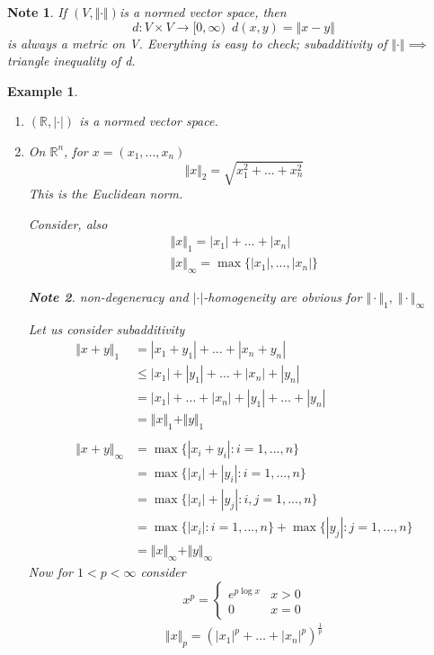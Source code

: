 \documentclass[11pt, oneside]{book}
\theoremstyle{break}
\newtheorem*{note}{Note}
\newtheorem{eg}{Example}[section]
\newcommand{\bb}[1]{\mathbb{#1}}			%
\begin{document}
\begin{note}
	If $(V, \Vert \cdot\Vert )$is a normed vector space, then
	\begin{equation}
		d: V \times V \to [0, \infty) \enspace d(x,y) = \Vert x - y \Vert
	\end{equation}
	is always a metric on V. Everything is easy to check; subadditivity of $\Vert \cdot\Vert  \implies$ triangle inequality of d.
\end{note}

\begin{eg}
	\begin{enumerate}
		\item $(\bb{R}, |\cdot|)$ is a normed vector space.
		\item On $\bb{R}^n$, for $x = (x_1, ..., x_n)$
			\begin{equation}
				\Vert x\Vert _2 = \sqrt{x_1^2 + \hdots + x_n^2}
			\end{equation}
			This is the Euclidean norm.

			Consider, also
			\begin{gather*}
				\Vert x\Vert _1 = |x_1| + \hdots + |x_n| \\
				\Vert x\Vert _\infty = \max\{|x_1|, ..., |x_n|\}
			\end{gather*}

			\begin{note}
				non-degeneracy and $|\cdot|$-homogeneity are obvious for $\Vert \cdot\Vert _1, \; \Vert \cdot\Vert _\infty$
			\end{note}

			Let us consider subadditivity
			\begin{align*}
				\Vert x + y\Vert _1 &= |x_1 + y_1| + \hdots + |x_n + y_n| \\
										&\leq |x_1| + |y_1| + \hdots + |x_n| + |y_n| \\
										&= |x_1| + \hdots + |x_n| + |y_1| + \hdots + |y_n| \\
										&= \Vert x\Vert _1 + \Vert y\Vert _1 \\
										\\
				\Vert x + y\Vert _\infty &= \max\{|x_i + y_i| : i = 1, ..., n\} \\
												&= \max\{|x_i| + |y_i| : i = 1, ..., n\} \\
												&= \max\{|x_i| + |y_j| : i, j = 1, ..., n\} \\
												&= \max\{|x_i| : i = 1, ..., n\} + \max\{|y_j| : j = 1, ..., n\}\\
												&= \Vert x\Vert _\infty + \Vert y\Vert _\infty
			\end{align*}
			Now for $1 < p < \infty$ consider
			\begin{equation}
				x^p =
					\begin{cases}
						e^{p \log x} & x > 0 \\
						0	& x = 0
					\end{cases}
			\end{equation}
			\begin{align*}
				\Vert x\Vert _p = (|x_1|^p + \hdots + |x_n|^p)^{\frac{1}{p}}
			\end{align*}


\end{enumerate}
\end{eg}
\end{document}
